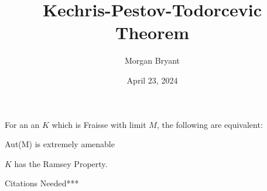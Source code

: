 \documentclass[a4paper]{article}
\title{Kechris-Pestov-Todorcevic Theorem}
\date{April 23, 2024}
\author{Morgan Bryant}
\begin{document}
\maketitle
\par{For an an  \(K\) which is Fraisse with limit \(M\), the following are equivalent:}\par{Aut(M) is extremely amenable}\par{\(K\) has the Ramsey Property.}\par{Citations Needed***}
\printbibliography
\end{document}
